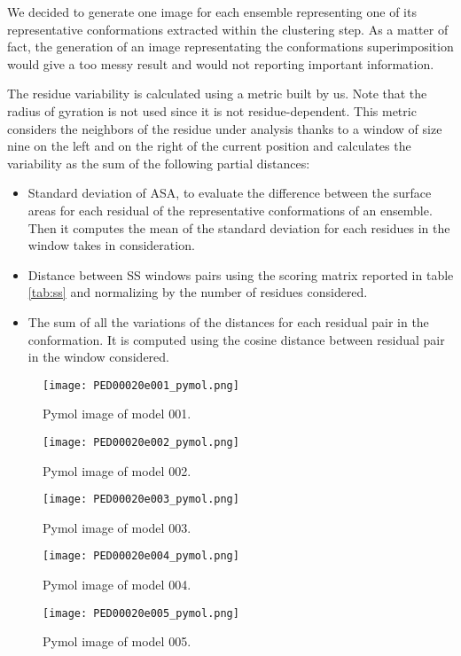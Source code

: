 We decided to generate one image for each ensemble representing one of its representative conformations extracted within the clustering step.
As a matter of fact, the generation of an image representating the conformations superimposition would give a too messy result and would not reporting important information.

\medskip
The residue variability is calculated using a metric built by us. Note that the radius of gyration is not used since it is not residue-dependent.
This metric considers the neighbors of the residue under analysis thanks to a window of size nine on the left and on the right of the current position and calculates the variability as the sum of the following partial distances:
\begin{itemize}
\item Standard deviation of ASA, to evaluate the difference between the surface areas for each residual of the representative conformations of an ensemble. Then it computes the mean of the standard deviation for each residues in the window takes in consideration. %
\item Distance between SS windows pairs using the scoring matrix reported in table \ref{tab:ss} and normalizing by the number of residues considered.
\item The sum of all the variations of the distances for each residual pair in the conformation. It is computed using the cosine distance between residual pair in the window considered. %
\end{itemize}

\begin{figure}[H]
	\begin{minipage}[b]{0.97\textwidth}
		\centering
		\texttt{[image: PED00020e001\_pymol.png]}
		\caption{Pymol image of model 001.}
		\label{model001p}
	\end{minipage}
	\begin{minipage}[b]{0.97\textwidth}
		\centering
		\texttt{[image: PED00020e002\_pymol.png]}
		\caption{Pymol image of model 002.}
		\label{model002p}
	\end{minipage}
\end{figure}
\begin{figure}[H]
	\begin{minipage}[b]{0.99\textwidth}
		\centering
		\texttt{[image: PED00020e003\_pymol.png]}
		\caption{Pymol image of model 003.}
		\label{model003p}
	\end{minipage}
	\begin{minipage}[b]{0.99\textwidth}
		\centering
		\texttt{[image: PED00020e004\_pymol.png]}
		\caption{Pymol image of model 004.}
		\label{model004p}
	\end{minipage}
	\begin{minipage}[b]{0.99\textwidth}
		\centering
		\texttt{[image: PED00020e005\_pymol.png]}
		\caption{Pymol image of model 005.}
		\label{model005p}
	\end{minipage}
\end{figure}

